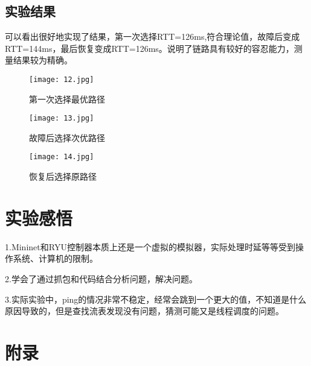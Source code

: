 \documentclass{xjtureport}
\begin{document}
\subsection{实验结果}
可以看出很好地实现了结果，第一次选择RTT=126ms,符合理论值，故障后变成RTT=144ms，最后恢复变成RTT=126ms。说明了链路具有较好的容忍能力，测量结果较为精确。
\begin{figure}[H]
	\centering
	\texttt{[image: 12.jpg]}
	\caption{第一次选择最优路径}
\end{figure}
\begin{figure}[H]
	\centering
	\texttt{[image: 13.jpg]}
	\caption{故障后选择次优路径}
\end{figure}
\begin{figure}[H]
	\centering
	\texttt{[image: 14.jpg]}
	\caption{恢复后选择原路径}
\end{figure}
\section{实验感悟}
1.Mininet和RYU控制器本质上还是一个虚拟的模拟器，实际处理时延等等受到操作系统、计算机的限制。\par
2.学会了通过抓包和代码结合分析问题，解决问题。\par 
3.实际实验中，ping的情况非常不稳定，经常会跳到一个更大的值，不知道是什么原因导致的，但是查找流表发现没有问题，猜测可能又是线程调度的问题。\par
\section{附录}
\end{document}
